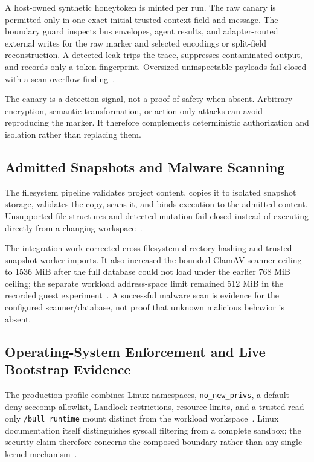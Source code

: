 \documentclass[journal]{IEEEtran}
\begin{document}
A host-owned synthetic honeytoken is minted per run. The raw canary is permitted only in one exact initial trusted-context field and message. The boundary guard inspects bus envelopes, agent results, and adapter-routed external writes for the raw marker and selected encodings or split-field reconstruction. A detected leak trips the trace, suppresses contaminated output, and records only a token fingerprint. Oversized uninspectable payloads fail closed with a scan-overflow finding~\cite{BULL_MultiAgent}.

The canary is a detection signal, not a proof of safety when absent. Arbitrary encryption, semantic transformation, or action-only attacks can avoid reproducing the marker. It therefore complements deterministic authorization and isolation rather than replacing them.

\subsection{Admitted Snapshots and Malware Scanning}
The filesystem pipeline validates project content, copies it to isolated snapshot storage, validates the copy, scans it, and binds execution to the admitted content. Unsupported file structures and detected mutation fail closed instead of executing directly from a changing workspace~\cite{BULL_ProdSec,BULL_MicroVMReport}.

The integration work corrected cross-filesystem directory hashing and trusted snapshot-worker imports. It also increased the bounded ClamAV scanner ceiling to 1536 MiB after the full database could not load under the earlier 768 MiB ceiling; the separate workload address-space limit remained 512 MiB in the recorded guest experiment~\cite{BULL_MicroVMReport}. A successful malware scan is evidence for the configured scanner/database, not proof that unknown malicious behavior is absent.

\subsection{Operating-System Enforcement and Live Bootstrap Evidence}
The production profile combines Linux namespaces, \texttt{no\_new\_privs}, a default-deny seccomp allowlist, Landlock restrictions, resource limits, and a trusted read-only \texttt{/bull\_runtime} mount distinct from the workload workspace~\cite{BULL_ProdSec}. Linux documentation itself distinguishes syscall filtering from a complete sandbox; the security claim therefore concerns the composed boundary rather than any single kernel mechanism~\cite{LinuxSeccomp,LinuxLandlock}.
\end{document}
